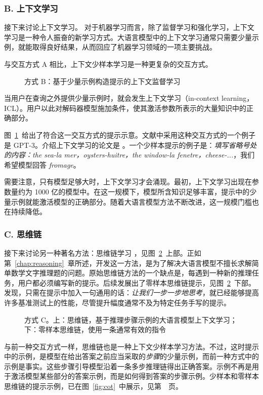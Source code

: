 \subsubsection{B. 上下文学习}
接下来讨论上下文学习。
对于机器学习而言，除了监督学习和强化学习，上下文学习是一种令人振奋的新学习方式。大语言模型中的上下文学习通常只需要少量示例，就能取得良好结果，从而回应了机器学习领域的一项主要挑战。

与交互方式 A 相比，上下文少样本学习是一种更复杂的交互方式。
\begin{figure}
  \begin{center}
    
    \caption{方式 B：基于少量示例构造提示的上下文监督学习}\label{fig:rlB}
  \end{center}
\end{figure}
当用户在查询之外提供少量示例时，就会发生上下文学习（in-context learning，ICL）。用户以此对解码器模型施加条件，使其激活参数所表示的大量知识中的正确部分。

图~\ref{fig:rlB}~给出了符合这一交互方式的提示示意。文献中采用这种交互方式的一个例子是 GPT-3。介绍上下文学习的论文是 \citet{brown2020language}。一个少样本提示的例子是：{\em 填写省略号处的内容：the sea-la mer，oysters-huitre，the window-la fenetre，cheese-...}，我们希望模型回答 {\em fromage}。

需要注意，只有模型足够大时，上下文学习才会涌现。最初，上下文学习出现在参数量约为 1000 亿的模型中。在这一规模下，模型所含知识足够丰富，提示中的少量示例就能激活模型的正确部分。随着大语言模型方法不断改进，这一规模门槛也在持续降低。

\subsubsection{C. 思维链}
接下来讨论另一种著名方法：思维链学习 \citep{wei2022chain}，见图~\ref{fig:rlC}~上部。正如第~\ref{chap:reasoning}~章所述，开发这一方法，是为了解决大语言模型不擅长求解简单数学文字推理题的问题。原始思维链方法的一个缺点是，每遇到一种新的推理任务，用户都必须编写新的提示。后续发展出了零样本思维链提示，见图~\ref{fig:rlC}~下部。\citet{kojima2022large} 发现，只需在提示中加入一句通用的话：{\em 让我们一步一步地思考}，就已经能够提高许多基准测试上的性能，尽管提升幅度通常不及为特定任务手写的提示。
\begin{figure}
  \begin{center}
    
    \caption{方式 C。上：思维链，基于推理步骤示例的大语言模型上下文学习；下：零样本思维链，使用一条通常有效的指令}\label{fig:rlC}
  \end{center}
\end{figure}
与前一种交互方式一样，思维链也是一种上下文少样本学习方法。不过，这时提示中的示例，是模型在给出答案之前应当采取的{\em 步骤}的少量示例，而前一种方式中的示例是事实。这些步骤引导模型沿着一条多步推理链得出正确答案。示例不再是用于激活模型某些部分的答案示例，而是如何得到答案的步骤示例。少样本和零样本思维链的提示示例，已在图~\ref{fig:cot}~中展示，见第~\pageref{fig:cot}~页。

